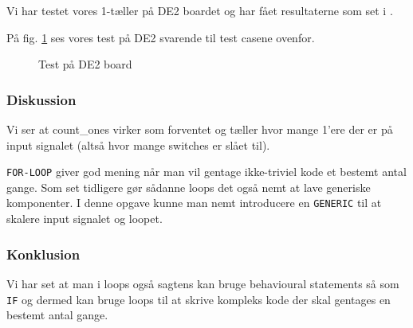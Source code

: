 {    Vi har testet vores 1-tæller på DE2 boardet og har fået resultaterne som set i .


    På fig. \ref{tab:ex5-5-count-ones-de2} ses vores test på DE2 svarende til test casene ovenfor.

    \begin{figure}[H]
        \centering
        \caption[count\_ones test cases]{Test på DE2 board}\label{tab:ex5-5-count-ones-de2}
    \end{figure}

    \subsubsection{Diskussion}

    Vi ser at count\_ones virker som forventet og tæller hvor mange 1'ere der er på input signalet (altså hvor mange switches er slået til).

    \texttt{FOR-LOOP} giver god mening når man vil gentage ikke-triviel kode et bestemt antal gange.
    Som set tidligere gør sådanne loops det også nemt at lave generiske komponenter.
    I denne opgave kunne man nemt introducere en \texttt{GENERIC} til at skalere input signalet og loopet.

    \subsubsection{Konklusion}

    Vi har set at man i loops også sagtens kan bruge behavioural statements så som \texttt{IF} og dermed kan bruge loops til at skrive kompleks kode der skal gentages en bestemt antal gange.
}